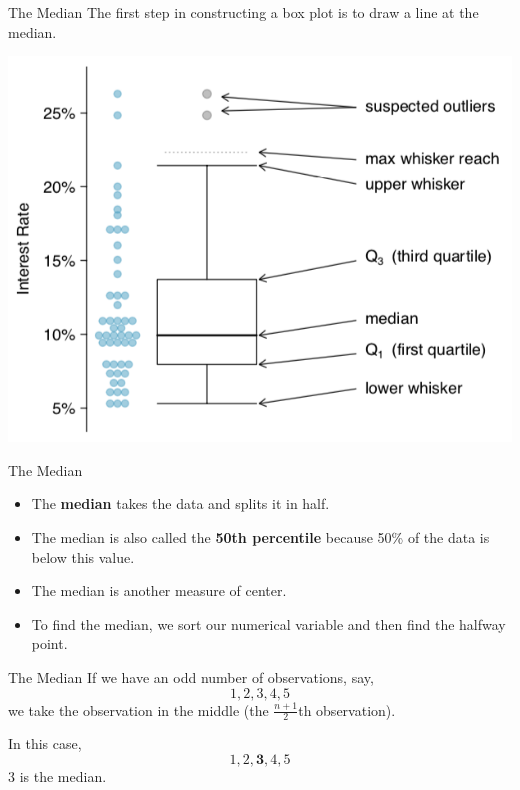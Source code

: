 \begin{frame}{The Median}
    The first step in constructing a box plot is to draw a line at the median. 
    
    \begin{center}
        \includegraphics[scale=0.35]{images/boxplot.png}
    \end{center}
\end{frame}

\begin{frame}{The Median}
    \begin{itemize}
        \item The \textbf{median} takes the data and splits it in half. 
        \item The median is also called the \textbf{50th percentile} because 50\% of the data is below this value.
        \item The median is another measure of center. 
        \item To find the median, we sort our numerical variable and then find the halfway point.
    \end{itemize}
\end{frame}

\begin{frame}{The Median}
    If we have an odd number of observations, say,
    \[
        1,2,3,4,5
    \]
    we take the observation in the middle (the $\frac{n+1}{2}$th observation).
   
   \vspace{12pt}In this case,
    \[
        1,2,\boldsymbol{3}, 4, 5
    \]
    3 is the median. 
\end{frame}

